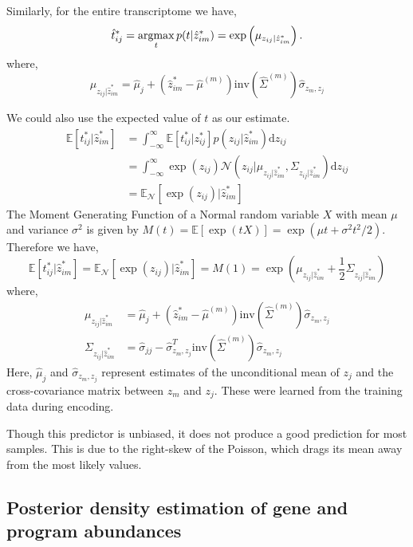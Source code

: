 \documentclass[10pt]{article}
\newcommand{\argmax}{\operatornamewithlimits{argmax}}
\begin{document}
Similarly, for the entire transcriptome we have, 
\[
\hat{t}^*_{ij} = \argmax_{t} p(t |  \hat{z}^*_{im})  = \exp\left( \mu_{z_{ij} | \hat{z}^*_{im}}  \right).
\]
where, 
\[
\mu_{z_{ij} | \hat{z}^*_{im}} =  \hat{\mu}_j + \left( \hat{z}^*_{im}- \hat{\mu}^{(m)} \right)\textrm{inv}\left( \hat{\Sigma}^{(m)} \right)\hat{\sigma}_{z_{m},z_j} 
\]


We could also use the expected value of $t$ as our estimate. 
\begin{align*}
\mathbb{E}[t^*_{ij}  | \hat{z}^*_{im}] & =  \int_{-\infty}^\infty \mathbb{E}[t^*_{ij} | z^*_{ij}] p(z_{ij} | \hat{z}^*_{im})  \textrm{d}z_{ij} \\
& = \int_{-\infty}^\infty \exp(z_{ij}) \mathcal{N}(z_{ij} | \mu_{z_{ij} | \hat{z}_{im}^* }, \Sigma_{z_{ij} | \hat{z}_{im}^* }) \textrm{d}z_{ij} \\
& = \mathbb{E}_{\mathcal{N}}[\exp(z_{ij}) | \hat{z}^*_{im}]
\end{align*}
The Moment Generating Function of a Normal random variable $X$ with mean $\mu$ and variance $\sigma^2$ is given by $M(t) = \mathbb{E}[\exp(tX)] = \exp(\mu t + \sigma^2t^2/2)$. Therefore we have, 
\[
\mathbb{E}[t^*_{ij}  | \hat{z}^*_{im}] = \mathbb{E}_{\mathcal{N}}[\exp(z_{ij}) | \hat{z}^*_{im}] = M(1) = \exp \left( \mu_{z_{ij} | \hat{z}_{im}^* } + \frac{1}{2}\Sigma_{z_{ij} | \hat{z}_{im}^* } \right)
\]
where, 
\begin{align*}
\mu_{z_{ij} | \hat{z}^*_{im}} &=  \hat{\mu}_j + \left( \hat{z}^*_{im}- \hat{\mu}^{(m)} \right)\textrm{inv}\left( \hat{\Sigma}^{(m)} \right)\hat{\sigma}_{z_{m},z_j} \\
\Sigma_{z_{ij} | \hat{z}^*_{im}} &=  \hat{\sigma}_{jj} -  \hat{\sigma}_{z_{m},z_j}^T\textrm{inv}\left( \hat{\Sigma}^{(m)} \right)\hat{\sigma}_{z_{m},z_j}
\end{align*}
Here, $\hat{\mu}_j $ and $\hat{\sigma}_{z_{m},z_j}$ represent estimates of the unconditional mean of $z_j$ and the cross-covariance matrix between $z_m$ and $z_j$. These were learned from the training data during encoding.

Though this predictor is unbiased, it does not produce a good prediction for most samples. This is due to the right-skew of the Poisson, which drags its mean away from the most likely values. 

\subsection{Posterior density estimation of gene and program abundances}
\end{document}
